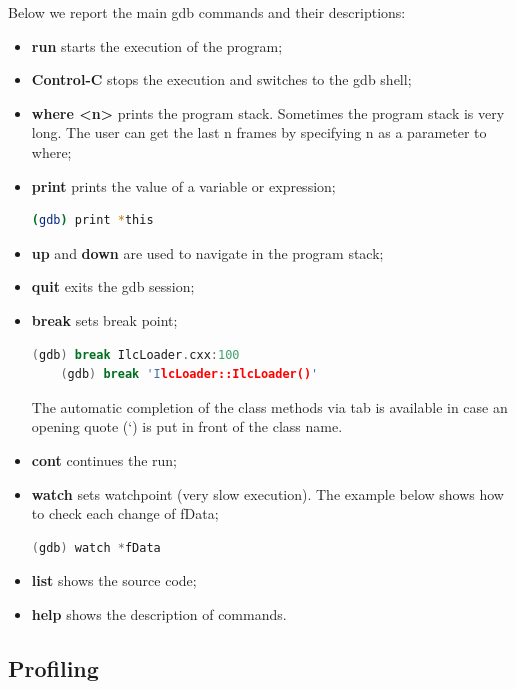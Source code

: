 \documentclass[12pt,a4paper,twoside]{article}
\begin{document}
Below we report the main gdb commands and their descriptions:

\begin{itemize}
\item \textbf{run} starts the execution of the program;
\item \textbf{Control-C} stops the execution and switches to the gdb shell;
\item \textbf{where <n>} prints the program stack. Sometimes the program
  stack is very long. The user can get the last n frames by specifying
  n as a parameter to where;
\item \textbf{print} prints the value of a variable or expression;

  \begin{lstlisting}[language=sh]
    (gdb) print *this
  \end{lstlisting}
\item \textbf{up} and \textbf{down} are used to navigate in the program stack;
\item \textbf{quit} exits the gdb session;
\item \textbf{break} sets break point;

  \begin{lstlisting}[language=C++]
    (gdb) break IlcLoader.cxx:100
    (gdb) break 'IlcLoader::IlcLoader()'
  \end{lstlisting}

  The automatic completion of the class methods via tab is available
  in case an opening quote (`) is put in front of the class name.

\item \textbf{cont} continues the run;
\item \textbf{watch} sets watchpoint (very slow execution). The example below
  shows how to check each change of fData;
  
  \begin{lstlisting}[language=C++]
    (gdb) watch *fData
  \end{lstlisting}
\item \textbf{list} shows the source code;
\item \textbf{help} shows the description of commands.
\end{itemize}


\subsection{Profiling}
\end{document}
